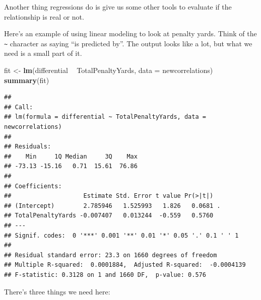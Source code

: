 \documentclass[
]{book}
\newenvironment{Shaded}{\begin{snugshade}}{\end{snugshade}}
\newcommand{\DataTypeTok}[1]{\textcolor[rgb]{0.13,0.29,0.53}{#1}}
\newcommand{\KeywordTok}[1]{\textcolor[rgb]{0.13,0.29,0.53}{\textbf{#1}}}
\newcommand{\NormalTok}[1]{#1}
\newcommand{\OperatorTok}[1]{\textcolor[rgb]{0.81,0.36,0.00}{\textbf{#1}}}
\newcommand{\StringTok}[1]{\textcolor[rgb]{0.31,0.60,0.02}{#1}}
\begin{document}
Another thing regressions do is give us some other tools to evaluate if the relationship is real or not.

Here's an example of using linear modeling to look at penalty yards. Think of the \texttt{\textasciitilde{}} character as saying ``is predicted by''. The output looks like a lot, but what we need is a small part of it.

\begin{Shaded}
\begin{Highlighting}[]
\NormalTok{fit <-}\StringTok{ }\KeywordTok{lm}\NormalTok{(differential }\OperatorTok{~}\StringTok{ }\NormalTok{TotalPenaltyYards, }\DataTypeTok{data =}\NormalTok{ newcorrelations)}
\KeywordTok{summary}\NormalTok{(fit)}
\end{Highlighting}
\end{Shaded}

\begin{verbatim}
## 
## Call:
## lm(formula = differential ~ TotalPenaltyYards, data = newcorrelations)
## 
## Residuals:
##    Min     1Q Median     3Q    Max 
## -73.13 -15.16   0.71  15.61  76.86 
## 
## Coefficients:
##                    Estimate Std. Error t value Pr(>|t|)  
## (Intercept)        2.785946   1.525993   1.826   0.0681 .
## TotalPenaltyYards -0.007407   0.013244  -0.559   0.5760  
## ---
## Signif. codes:  0 '***' 0.001 '**' 0.01 '*' 0.05 '.' 0.1 ' ' 1
## 
## Residual standard error: 23.3 on 1660 degrees of freedom
## Multiple R-squared:  0.0001884,	Adjusted R-squared:  -0.0004139 
## F-statistic: 0.3128 on 1 and 1660 DF,  p-value: 0.576
\end{verbatim}

There's three things we need here:
\end{document}
